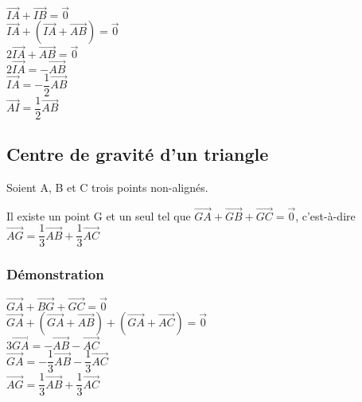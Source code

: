 $\overrightarrow{IA} + \overrightarrow{IB} = \overrightarrow{0} $\\

$ \overrightarrow{IA} + \left(\overrightarrow{IA} + \overrightarrow{AB}\right) = \overrightarrow{0} $\\

$ 2\overrightarrow{IA} + \overrightarrow{AB} = \overrightarrow{0} $\\

$ 2\overrightarrow{IA} = -\overrightarrow{AB} $\\

$\overrightarrow{IA} = -\dfrac{1}{2} \overrightarrow{AB} $\\

$ \overrightarrow{AI} = \dfrac{1}{2} \overrightarrow{AB} $\\

\newpage 

\subsection{Centre de gravité d'un triangle}

Soient A, B et C trois points non-alignés.

Il existe un point G et un seul tel que $\overrightarrow{GA} + \overrightarrow{GB} + \overrightarrow{GC} = \overrightarrow{0} $, c'est-à-dire $\overrightarrow{AG} = \dfrac{1}{3} \overrightarrow{AB} + \dfrac{1}{3} \overrightarrow{AC} $ \\

\subsubsection{Démonstration}

$\overrightarrow{GA}+\overrightarrow{BG}+\overrightarrow{GC}=\overrightarrow{0}$\\

$ \overrightarrow{GA} + \left(\overrightarrow{GA} + \overrightarrow{AB} \right) + \left(\overrightarrow{GA} + \overrightarrow{AC}\right) = \overrightarrow{0} $\\

$ 3\overrightarrow{GA} = -\overrightarrow{AB} - \overrightarrow{AC} $\\

$ \overrightarrow{GA} = -\dfrac{1}{3} \overrightarrow{AB} - \dfrac{1}{3} \overrightarrow{AC} $\\

$ \overrightarrow{AG} = \dfrac{1}{3} \overrightarrow{AB} + \dfrac{1}{3} \overrightarrow{AC} $\\

